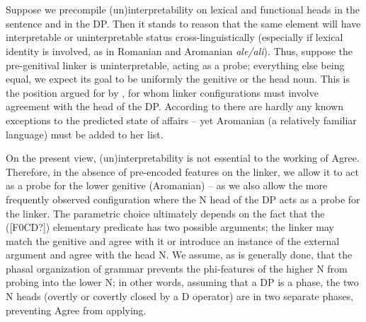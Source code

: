 \documentclass[output=paper]{langsci/langscibook}
\begin{document}
\begin{styleSfondomedioiColorexi}
\ea%
    \label{ex:key:28}
    \gll\\
        \\
    \glt
    \z

              
\end{styleSfondomedioiColorexi}

 
\begin{styleSfondomedioiColorexi}
Suppose we precompile (un)interpretability on lexical and functional heads in the sentence and in the DP. Then it stands to reason that the same element will have interpretable or uninterpretable status cross-linguistically (especially if lexical identity is involved, as in Romanian and Aromanian \textit{ale/ali}). Thus, suppose the pre-genitival linker is uninterpretable, acting as a probe; everything else being equal, we expect its goal to be uniformly the genitive or the head noun. This is the position argued for by \citet{Philip2012}, for whom linker configurations must involve agreement with the head of the DP. According to \citet{Philip2012} there are hardly any known exceptions to the predicted state of affairs – yet Aromanian (a relatively familiar language) must be added to her list. 
\end{styleSfondomedioiColorexi}

\begin{styleSfondomedioiColorexi}
  On the present view, (un)interpretability is not essential to the working of Agree. Therefore, in the absence of pre-encoded features on the linker, we allow it to act as a probe for the lower genitive (Aromanian) – as we also allow the more frequently observed configuration where the N head of the DP acts as a probe for the linker. The parametric choice ultimately depends on the fact that the ([F0CD?]) elementary predicate has two possible arguments; the linker may match the genitive and agree with it or introduce an instance of the external argument and agree with the head N. We assume, as is generally done, that the phasal organization of grammar prevents the phi-features of the higher N from probing into the lower N; in other words, assuming that a DP is a phase, the two N heads (overtly or covertly closed by a D operator) are in two separate phases, preventing Agree from applying.  
\end{styleSfondomedioiColorexi}
\end{document}
